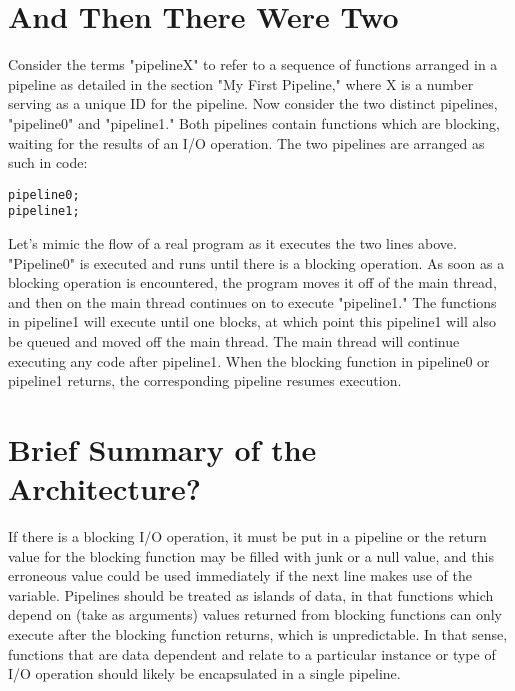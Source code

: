 \documentclass[./LRM_main.tex]{subfiles}
\begin{document}
\section{And Then There Were Two}

Consider the terms "pipelineX" to refer to a sequence of functions arranged in a pipeline as detailed in the section "My First Pipeline," where X is a number serving as a unique ID for the pipeline. Now consider the two distinct pipelines, "pipeline0" and "pipeline1." Both pipelines contain functions which are blocking, waiting for the results of an I/O operation. The two pipelines are arranged as such in code:
\begin{lstlisting}
pipeline0;
pipeline1;
\end{lstlisting}
Let's mimic the flow of a real program as it executes the two lines above. "Pipeline0" is executed and runs until there is a blocking operation. As soon as a blocking operation is encountered, the program moves it off of the main thread, and then on the main thread continues on to execute "pipeline1." The functions in pipeline1 will execute until one blocks, at which point this pipeline1 will also be queued and moved off the main thread. The main thread will continue executing any code after pipeline1. When the blocking function in pipeline0 or pipeline1 returns, the corresponding pipeline resumes execution.   


\section{Brief Summary of the Architecture?}
If there is a blocking I/O operation, it must be put in a pipeline or the return value for the blocking function may be filled with junk or a null value, and this erroneous value could be used immediately if the next line makes use of the variable. Pipelines should be treated as islands of data, in that functions which depend on (take as arguments) values returned from blocking functions can only execute after the blocking function returns, which is unpredictable. In that sense, functions that are data dependent and relate to a particular instance or type of I/O operation should likely be encapsulated in a single pipeline. 
\end{document}
